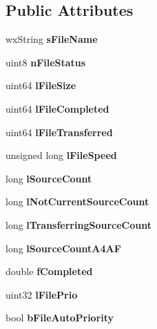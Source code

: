 \subsection*{Public Attributes}
\begin{DoxyCompactItemize}
\item 
wxString {\bfseries sFileName}\label{classDownloadFile_a0e5e72cffb9c05d9cf52d55c94a246ce}

\item 
uint8 {\bfseries nFileStatus}\label{classDownloadFile_a17d1978a291ee8680fb548525e2cadd9}

\item 
uint64 {\bfseries lFileSize}\label{classDownloadFile_a1a15635243d35cf2960bb52cef66889d}

\item 
uint64 {\bfseries lFileCompleted}\label{classDownloadFile_a80a1adf814addddf3cf994f7d8b8afd1}

\item 
uint64 {\bfseries lFileTransferred}\label{classDownloadFile_a5c407060134ad0becc2f0d8fad058500}

\item 
unsigned long {\bfseries lFileSpeed}\label{classDownloadFile_a06057a61733cb8453a5d5607eec950df}

\item 
long {\bfseries lSourceCount}\label{classDownloadFile_a76a1248d4a0ed451bdc203d5350be7d7}

\item 
long {\bfseries lNotCurrentSourceCount}\label{classDownloadFile_a9b294b57c787593e97da6c2298d68222}

\item 
long {\bfseries lTransferringSourceCount}\label{classDownloadFile_a1846c5f9d8fe1a35909ad5120f22ec3b}

\item 
long {\bfseries lSourceCountA4AF}\label{classDownloadFile_a5617fdc6838ca6f9fb062459b26f8689}

\item 
double {\bfseries fCompleted}\label{classDownloadFile_a6be384c0913096ad371717456ef94065}

\item 
uint32 {\bfseries lFilePrio}\label{classDownloadFile_a65e6522c1dd85063e9cd664d65193861}

\item 
bool {\bfseries bFileAutoPriority}\label{classDownloadFile_a88bd9f50b3ea19c67d2ddae5a6325400}


\end{DoxyCompactItemize}
